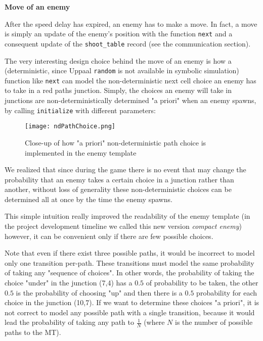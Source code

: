 \documentclass[
10pt, %
a4paper, %
oneside, %
headinclude,footinclude, %
BCOR5mm, %
]{scrartcl}
\begin{document}
				\begin{flushleft}
					\textbf{Move of an enemy}
					
					After the speed delay has expired, an enemy has to make a move. In fact, a move is simply an update of the enemy's position with the function \texttt{next} and a consequent update of the \texttt{shoot\_table} record (see the communication section).
					
					The very interesting design choice behind the move of an enemy is how a (deterministic, since Uppaal \texttt{random} is not available in symbolic simulation) function like \texttt{next} can model the non-deterministic next cell choice an enemy has to take in a red paths junction. Simply, the choices an enemy will take in junctions are non-deterministically determined "a priori" when an enemy spawns, by calling \texttt{initialize} with different parameters:
					\begin{figure}[h!]
						\centering
						\texttt{[image: ndPathChoice.png]}
						\caption{Close-up of how "a priori" non-deterministic path choice is implemented in the enemy template}
					\end{figure}
					
					We realized that since during the game there is no event that may change the probability that an enemy takes a certain choice in a junction rather than another, without loss of generality these non-deterministic choices can be determined all at once by the time the enemy spawns.
					
					This simple intuition really improved the readability of the enemy template (in the project development timeline we called this new version \emph{compact enemy}) however, it can be convenient only if there are few possible choices.
					
					Note that even if there exist three possible paths, it would be incorrect to model only one transition per-path. These transitions must model the same probability of taking any "sequence of choices". In other words, the probability of taking the choice "under" in the junction (7,4) has a $0.5$ of probability to be taken, the other $0.5$ is the probability of choosing "up" and then there is a $0.5$ probability for each choice in the junction (10,7). If we want to determine these choices "a priori", it is not correct to model any possible path with a single transition, because it would lead the probability of taking any path to $\frac{1}{N}$ (where $N$ is the number of possible paths to the MT).
				\end{flushleft}
\end{document}
